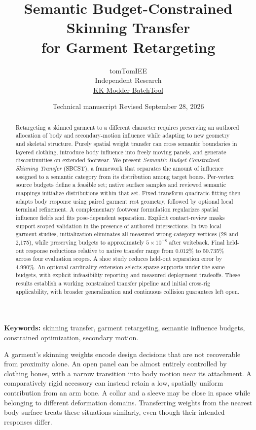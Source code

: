 \documentclass[10pt,twocolumn,letterpaper]{article}
\title{\vspace{-1.4em}\textbf{Semantic Budget-Constrained Skinning Transfer\\for Garment Retargeting}}
\author{tomTomIEE\\\small Independent Research\\\small\href{https://github.com/tomTom1010-IEE/KK_Modder-BatchTool}{KK Modder BatchTool}}
\date{\small Technical manuscript \;\textbullet\; Revised September 28, 2026}
\makeatletter
\renewcommand\section{\@startsection{section}{1}{\z@}{-2.0ex plus -.5ex minus -.2ex}{.9ex plus .2ex}{\normalfont\large\bfseries\raggedright}}
\makeatother
\begin{document}
\raggedbottom
\maketitle

\begin{abstract}
Retargeting a skinned garment to a different character requires preserving an authored allocation of body and secondary-motion influence while adapting to new geometry and skeletal structure. Purely spatial weight transfer can cross semantic boundaries in layered clothing, introduce body influence into freely moving panels, and generate discontinuities on extended footwear. We present \emph{Semantic Budget-Constrained Skinning Transfer} (SBCST), a framework that separates the amount of influence assigned to a semantic category from its distribution among target bones. Per-vertex source budgets define a feasible set; native surface samples and reviewed semantic mappings initialize distributions within that set. Fixed-transform quadratic fitting then adapts body response using paired garment rest geometry, followed by optional local terminal refinement. A complementary footwear formulation regularizes spatial influence fields and fits pose-dependent separation. Explicit contact-review masks support scoped validation in the presence of authored intersections. In two local garment studies, initialization eliminates all measured wrong-category vertices (28 and 2,175), while preserving budgets to approximately $5\times10^{-8}$ after writeback. Final held-out response reductions relative to native transfer range from 0.012\% to 50.735\% across four evaluation scopes. A shoe study reduces held-out separation error by 4.990\%. An optional cardinality extension selects sparse supports under the same budgets, with explicit infeasibility reporting and measured deployment tradeoffs. These results establish a working constrained transfer pipeline and initial cross-rig applicability, with broader generalization and continuous collision guarantees left open.
\end{abstract}
\noindent\textbf{Keywords:} skinning transfer, garment retargeting, semantic influence budgets, constrained optimization, secondary motion.

\section{Introduction}
A garment's skinning weights encode design decisions that are not recoverable from proximity alone. An open panel can be almost entirely controlled by clothing bones, with a narrow transition into body motion near its attachment. A comparatively rigid accessory can instead retain a low, spatially uniform contribution from an arm bone. A collar and a sleeve may be close in space while belonging to different deformation domains. Transferring weights from the nearest body surface treats these situations similarly, even though their intended responses differ.
\end{document}
